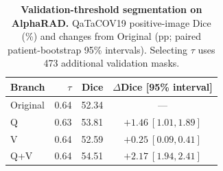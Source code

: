 \begin{table}[t]
\centering
\caption{\textbf{Validation-threshold segmentation on AlphaRAD.} QaTaCOV19 positive-image Dice (\%) and changes from Original (pp; paired patient-bootstrap 95\% intervals). Selecting $\tau$ uses 473 additional validation masks.}
\label{tab:supp-validation-segmentation}
\small
\begin{tabular}{@{}lrrc@{}}
\toprule
Branch & $\tau$ & Dice & $\Delta$Dice [95\% interval] \\
\midrule
Original & 0.64 & 52.34 & --- \\
Q & 0.63 & 53.81 & $+1.46\ [1.01,1.89]$ \\
V & 0.64 & 52.59 & $+0.25\ [0.09,0.41]$ \\
Q+V & 0.64 & 54.51 & $+2.17\ [1.94,2.41]$ \\
\bottomrule
\end{tabular}
\end{table}
